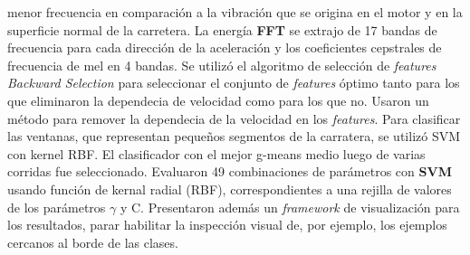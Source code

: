menor frecuencia en comparación a la vibración que se origina en el motor y en la superficie normal de la carretera. La energía \textbf{FFT} se extrajo de
17 bandas de frecuencia para cada dirección de la aceleración y los coeficientes cepstrales de frecuencia de mel en 4 bandas. Se utilizó el algoritmo de
selección de \emph{features} \emph{Backward Selection} para seleccionar el conjunto de \emph{features} óptimo tanto para los que eliminaron la dependecia
de velocidad como para los que no. Usaron un método para remover la dependecia de la velocidad en los \emph{features}. Para clasificar las ventanas, que
representan pequeños segmentos de la carratera, se utilizó SVM con kernel RBF. El clasificador con el mejor g-means medio luego de varias corridas fue
seleccionado. Evaluaron 49 combinaciones de parámetros con \textbf{SVM} usando función de kernal radial (RBF), correspondientes a una rejilla de valores
de los parámetros $\gamma$ y C. Presentaron además un \emph{framework} de visualización para los resultados, parar habilitar la inspección visual de,
por ejemplo, los ejemplos cercanos al borde de las clases.\\

